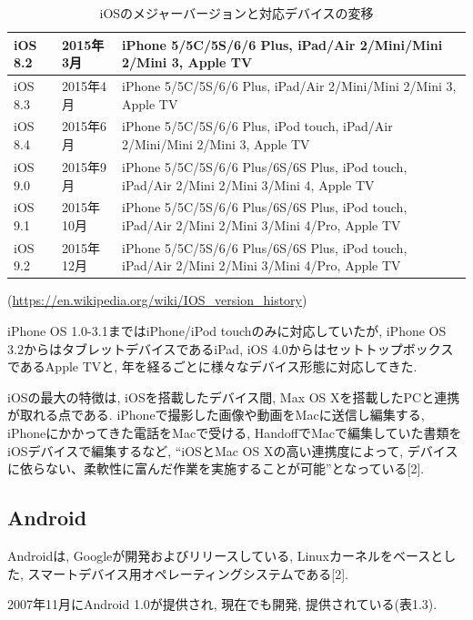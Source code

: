\begin{table}[tb]
\begin{center}
\begin{tabular}{|l|l|p{10cm}|}
iOS 8.2 & 2015年3月 & iPhone 5/5C/5S/6/6 Plus, iPad/Air 2/Mini/Mini 2/Mini 3, Apple TV \\ \hline
iOS 8.3 & 2015年4月 & iPhone 5/5C/5S/6/6 Plus, iPad/Air 2/Mini/Mini 2/Mini 3, Apple TV \\ \hline
iOS 8.4 & 2015年6月 & iPhone 5/5C/5S/6/6 Plus, iPod touch, iPad/Air 2/Mini/Mini 2/Mini 3, Apple TV \\ \hline
iOS 9.0 & 2015年9月 & iPhone 5/5C/5S/6/6 Plus/6S/6S Plus, iPod touch, iPad/Air 2/Mini 2/Mini 3/Mini 4, Apple TV \\ \hline
iOS 9.1 & 2015年10月 & iPhone 5/5C/5S/6/6 Plus/6S/6S Plus, iPod touch, iPad/Air 2/Mini 2/Mini 3/Mini 4/Pro, Apple TV \\ \hline
iOS 9.2 & 2015年12月 & iPhone 5/5C/5S/6/6 Plus/6S/6S Plus, iPod touch, iPad/Air 2/Mini 2/Mini 3/Mini 4/Pro, Apple TV \\ \hline
\end{tabular}
\caption{iOSのメジャーバージョンと対応デバイスの変移}
\end{center}
\begin{flushright}
(\url{https://en.wikipedia.org/wiki/IOS_version_history})
\end{flushright}
\end{table}

iPhone OS 1.0-3.1まではiPhone/iPod touchのみに対応していたが, iPhone OS 3.2からはタブレットデバイスであるiPad, iOS 4.0からはセットトップボックスであるApple TVと, 年を経るごとに様々なデバイス形態に対応してきた.

iOSの最大の特徴は, iOSを搭載したデバイス間, Max OS Xを搭載したPCと連携が取れる点である.
iPhoneで撮影した画像や動画をMacに送信し編集する, iPhoneにかかってきた電話をMacで受ける, HandoffでMacで編集していた書類をiOSデバイスで編集するなど, “iOSとMac OS Xの高い連携度によって, デバイスに依らない、柔軟性に富んだ作業を実施することが可能”となっている[2].

\subsection{Android}
Androidは, Googleが開発およびリリースしている, Linuxカーネルをベースとした, スマートデバイス用オペレーティングシステムである[2].

2007年11月にAndroid 1.0が提供され, 現在でも開発, 提供されている(表1.3).

